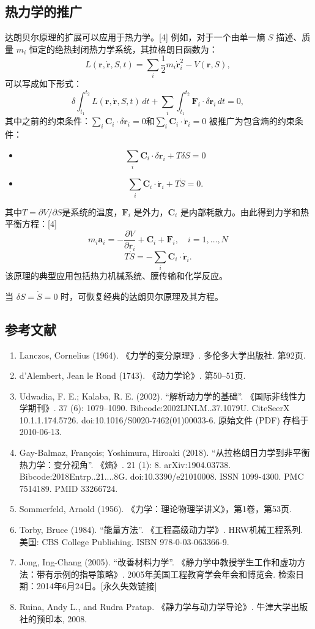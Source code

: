 \subsection{热力学的推广}
达朗贝尔原理的扩展可以应用于热力学。[4] 例如，对于一个由单一熵 \( S \) 描述、质量 \( m_i \) 恒定的绝热封闭热力学系统，其拉格朗日函数为：
\[
L(\mathbf{r}, \dot{\mathbf{r}}, S, t) = \sum_i \frac{1}{2} m_i \dot{\mathbf{r}}_i^2 - V(\mathbf{r}, S),~
\]
可以写成如下形式：
\[
\delta \int_{t_1}^{t_2} L(\mathbf{r}, \dot{\mathbf{r}}, S, t) \, dt + \sum_i \int_{t_1}^{t_2} \mathbf{F}_i \cdot \delta \mathbf{r}_i \, dt = 0,~
\]
其中之前的约束条件：\(\sum_i \mathbf{C}_i \cdot \delta \mathbf{r}_i = 0\)和\(\sum_i \mathbf{C}_i \cdot \dot{\mathbf{r}}_i = 0\)
被推广为包含熵的约束条件：
\begin{itemize}
\item \[\sum_i \mathbf{C}_i \cdot \delta \mathbf{r}_i + T \delta S = 0~\]
\item \[\sum_i \mathbf{C}_i \cdot \dot{\mathbf{r}}_i + T \dot{S} = 0.~\]
\end{itemize}
其中\(T = \partial V/\partial S\)是系统的温度，\( \mathbf{F}_i \) 是外力，\( \mathbf{C}_i \) 是内部耗散力。由此得到力学和热平衡方程：[4]
\[
m_i \mathbf{a}_i = -\frac{\partial V}{\partial \mathbf{r}_i} + \mathbf{C}_i + \mathbf{F}_i, \quad i = 1, \dots, N~
\]
\[
T \dot{S} = -\sum_i \mathbf{C}_i \cdot \dot{\mathbf{r}}_i.~
\]
该原理的典型应用包括热力机械系统、膜传输和化学反应。

当 \( \delta S = \dot{S} = 0 \) 时，可恢复经典的达朗贝尔原理及其方程。
\subsection{参考文献}
\begin{enumerate}
\item Lanczos, Cornelius (1964). 《力学的变分原理》. 多伦多大学出版社. 第92页.
\item d'Alembert, Jean le Rond (1743). 《动力学论》. 第50–51页.
\item Udwadia, F. E.; Kalaba, R. E. (2002). “解析动力学的基础”. 《国际非线性力学期刊》. 37 (6): 1079–1090. Bibcode:2002IJNLM..37.1079U. CiteSeerX 10.1.1.174.5726. doi:10.1016/S0020-7462(01)00033-6. 原始文件 (PDF) 存档于2010-06-13.
\item Gay-Balmaz, François; Yoshimura, Hiroaki (2018). “从拉格朗日力学到非平衡热力学：变分视角”. 《熵》. 21 (1): 8. arXiv:1904.03738. Bibcode:2018Entrp..21....8G. doi:10.3390/e21010008. ISSN 1099-4300. PMC 7514189. PMID 33266724.
\item Sommerfeld, Arnold (1956). 《力学：理论物理学讲义》，第1卷，第53页.
\item Torby, Bruce (1984). “能量方法”. 《工程高级动力学》. HRW机械工程系列. 美国: CBS College Publishing. ISBN 978-0-03-063366-9.
\item Jong, Ing-Chang (2005). “改善材料力学”. 《静力学中教授学生工作和虚功方法：带有示例的指导策略》. 2005年美国工程教育学会年会和博览会. 检索日期：2014年6月24日。[永久失效链接]
\item Ruina, Andy L., and Rudra Pratap. 《静力学与动力学导论》. 牛津大学出版社的预印本, 2008.
\end{enumerate}